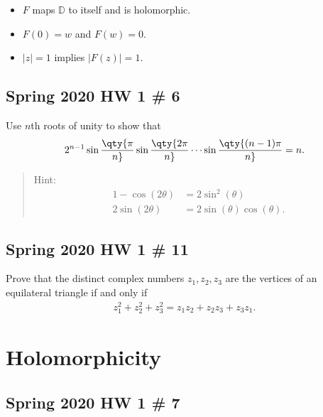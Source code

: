 \begin{itemize}
\tightlist
\item
  \(F\) maps \({\mathbb{D}}\) to itself and is holomorphic.
\item
  \(F(0) = w\) and \(F(w) = 0\).
\item
  \({\left\lvert {z} \right\rvert} = 1\) implies
  \({\left\lvert {F(z)} \right\rvert} = 1\).
\end{itemize}

\hypertarget{spring-2020-hw-1-6}{%
\subsection{Spring 2020 HW 1 \# 6}\label{spring-2020-hw-1-6}}

Use \(n\)th roots of unity to show that
\begin{align*}
2^{n-1} \sin\qty{\pi \over n} \sin\qty{2\pi \over n} \cdots \sin\qty{(n-1)\pi \over n} = n
.\end{align*}

\begin{quote}
Hint:
\begin{align*}
1 - \cos(2\theta) &= 2\sin^2(\theta) \\
2 \sin(2\theta) &= 2\sin(\theta) \cos(\theta)
.\end{align*}
\end{quote}

\hypertarget{spring-2020-hw-1-11}{%
\subsection{Spring 2020 HW 1 \# 11}\label{spring-2020-hw-1-11}}

Prove that the distinct complex numbers \(z_1, z_2, z_3\) are the
vertices of an equilateral triangle if and only if
\begin{align*}
z_{1}^{2}+z_{2}^{2}+z_{3}^{2}=z_{1} z_{2}+z_{2} z_{3}+z_{3} z_{1}
.\end{align*}

\hypertarget{holomorphicity}{%
\section{Holomorphicity}\label{holomorphicity}}

\hypertarget{spring-2020-hw-1-7}{%
\subsection{Spring 2020 HW 1 \# 7}\label{spring-2020-hw-1-7}}

